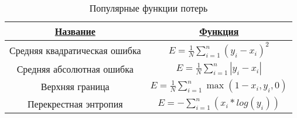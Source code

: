\begin{table}[H]
  \centering
  \caption{Популярные функции потерь} \label{loss_funcs}
  \begin{tabular}{|c|c|}
    \hline    
    \hyperlink{name}{Название} & \hyperlink{func}{Функция}\\
    \hline
    Средняя квадратическая ошибка & $E=\frac{1}{N}\displaystyle\sum\limits_{i=1}^{n}(y_i - x_i)^2$\\
    \hline
    Средняя абсолютная ошибка & $E=\frac{1}{N}\displaystyle\sum\limits_{i=1}^{n}|y_i - x_i|$ \\
    \hline
    Верхняя граница & $E=\frac{1}{N}\displaystyle\sum\limits_{i=1}^{n}\max(1-x_i, y_i, 0)$ \\
    \hline
    Перекрестная энтропия & $E=-\displaystyle\sum\limits_{i=1}^{n}(x_i*log(y_i))$ \\
    \hline
  \end{tabular}
\end{table}